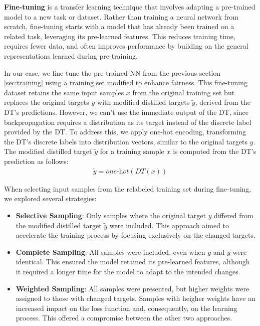 \textbf{Fine-tuning} is a transfer learning technique
that involves adapting a pre-trained model to a new task or dataset.
Rather than training a neural network from scratch,
fine-tuning starts with a model that has already been trained on a related task,
leveraging its pre-learned features.
This reduces training time, requires fewer data, and often improves performance
by building on the general representations learned during pre-training. \cite{fine_tuning}

In our case, we fine-tune the pre-trained NN from the previous section \ref{sec:training}
using a training set modified to enhance fairness.
This fine-tuning dataset retains the same input samples $x$ from the original training set but replaces
the original targets $y$ with modified distilled targets $\tilde{y}$,
derived from the DT's predictions.
However, we can't use the immediate output of the DT, since backpropagation requires a distribution
as its target instead of the discrete label provided by the DT.
To address this, we apply one-hot encoding, transforming
the DT's discrete labels into distribution vectors,
similar to the original targets $y$.
The modified distilled target $\tilde{y}$ for a training sample $x$ is computed
from the DT's prediction as follows:
\begin{align}
    \tilde{y} = \textit{one-hot}(\textit{DT}(x))
\end{align}

When selecting input samples from the relabeled training set during fine-tuning,
we explored several strategies:

\begin{itemize}  
    \item \textbf{Selective Sampling}:  
    Only samples where the original target $y$ differed from the modified distilled target $\tilde{y}$ were included.  
    This approach aimed to accelerate the training process by focusing exclusively on the changed targets.  

    \item \textbf{Complete Sampling}:  
    All samples were included, even when $y$ and $\tilde{y}$ were identical.  
    This ensured the model retained its pre-learned features, although it required a longer time  
    for the model to adapt to the intended changes.  

    \item \textbf{Weighted Sampling}:  
    All samples were presented, but higher weights were assigned to those with changed targets.  
    Samples with heigher weights have an increased impact on the loss function and,
    consequently, on the learning process.
    This offered a compromise between the other two approaches.
\end{itemize}  

